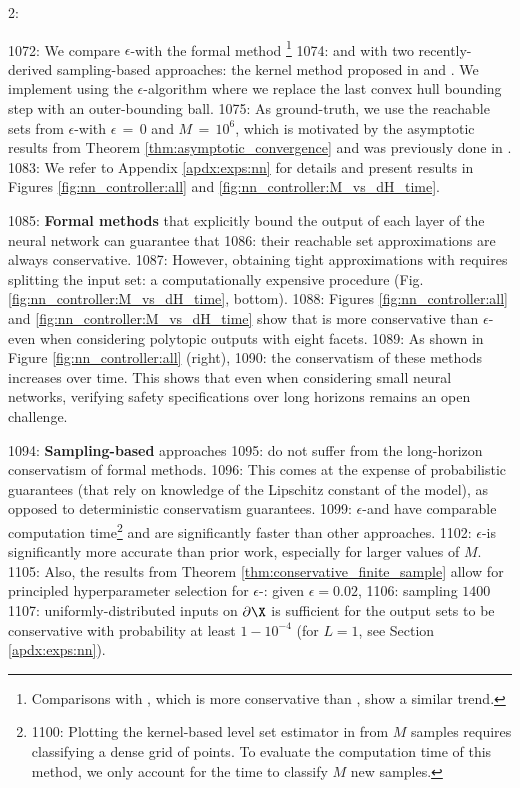 2: \documentclass[12pt]{l4dc2022} %
\begin{document}
1072: We compare $\epsilon$-\randup with the formal method \reachlp \citep{Everett21_journal}\footnote{Comparisons with \reachsdp \citep{Hu2020}, which is more conservative than \reachlp, show a similar trend.} %
1074: and with two recently-derived sampling-based approaches: the kernel method proposed in \citep{ThorpeL4DC2021} and \gotube \citep{Gruenbacher2021}. We implement \gotube using the $\epsilon$-\randup algorithm where we replace the last convex hull bounding step with an outer-bounding ball. 
1075: As ground-truth, we use the reachable sets from $\epsilon$-\randup with $\epsilon\,{=}\,0$ and $M\,{=}\,10^6$, which is motivated by the asymptotic results from Theorem \ref{thm:asymptotic_convergence} and was previously done in \citep{Everett21_journal}. 
1083:  We refer to Appendix \ref{apdx:exps:nn} for details and present results in Figures \ref{fig:nn_controller:all} and \ref{fig:nn_controller:M_vs_dH_time}.

1085: \textbf{Formal methods} that explicitly bound the output of each layer of the neural network can guarantee that %
1086: their reachable set approximations are always conservative. %
1087: However, obtaining tight approximations with \reachlp requires splitting the input set: a computationally expensive procedure (Fig.\,\ref{fig:nn_controller:M_vs_dH_time}, bottom). 
1088: Figures \ref{fig:nn_controller:all}  and \ref{fig:nn_controller:M_vs_dH_time} show that \reachlp is more conservative than $\epsilon$-\randup even when considering polytopic outputs with eight facets. %
1089: As shown in Figure \ref{fig:nn_controller:all} (right),  %
1090: the conservatism of these methods increases over time. This shows that even when considering small neural networks, verifying safety specifications over long horizons remains an open challenge. 

1094: \textbf{Sampling-based} approaches %
1095: do not suffer from the long-horizon conservatism of formal methods. 
1096: This comes at the expense of probabilistic guarantees (that rely on knowledge of the Lipschitz constant of the model), as opposed to deterministic conservatism guarantees. %
1099: $\epsilon$-\randup and \gotube have comparable computation time\footnote{%
1100: Plotting the kernel-based level set estimator in \citep{ThorpeL4DC2021} from $M$ samples requires classifying a dense grid of points. To evaluate the computation time of this method, we only account for the time to classify $M$ new samples.}  and are significantly faster than other approaches. %
1102: $\epsilon$-\randup is significantly more accurate than prior work, especially for larger values of $M$. 
1105: Also, the results from Theorem \ref{thm:conservative_finite_sample} allow for principled hyperparameter selection for $\epsilon$-\randup: given $\epsilon=0.02$, %
1106: sampling $1400$ %
1107: uniformly-distributed inputs on $\partial\X$ is sufficient for the output sets to be conservative with probability at least $1-10^{-4}$ (for $L=1$, see Section \ref{apdx:exps:nn}). 
\end{document}
